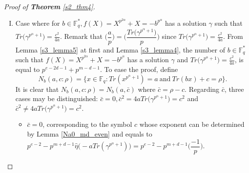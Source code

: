 \documentclass[final,1p,times]{elsarticle}
\begin{document}
\begin{proof}[Proof of \textbf{Theorem} \ref{s2_thm4}]
\begin{enumerate}[(I)]
From Lemma \ref{s3_lemma4}  and Lemma \ref{s3_lemma5}, the number of $ b\in \mathbb{F}_{q}^{*}$ such that $f(X)=X^{p^{2\alpha}} +X=- b^{p^{\alpha}} $ has a solution $ \gamma $ and $ Tr\bigl(\gamma^{p^{\alpha}+1}\bigr)=0 $, is equal to $ p^{e-2d-1}-(p-1)p^{m-d-1}-1 $. By Lemma \ref{Na0_md_even}, the exponent of symbol $ c $ is $ p^{e-2}+p^{m+d-1} $. From Lemma \ref{Nac_md_even}, the exponents of other symbols other than $ c $ are $ p^{e-2} $. Hence, \textit{the contribution of this case} to the complete weight enumerator is
\begin{equation}\label{proof_thm4_cwe02}
C_{2}=\bigl(p^{e-2d-1}-(p-1)p^{m-d-1}-1\bigr)w_{c}^{p^{e-2}+p^{m+d-1}}\prod_{\substack{0\leq i\leq p-1\\i\ne c}}w_{i}^{p^{e-2}}.
\end{equation}
From (\ref{proof_thm4_cwe02}), the corresponding Hamming weight and the multiplicity are respectively
\begin{equation}\label{proof_thm4_hamming02}
\begin{split}
wt(C_{2})&=(p-1)p^{e-2}+p^{m+d-1},\\
A_{C_{2}}&=p^{e-2d-1}-(p-1)p^{m-d-1}-1.
\end{split}
\end{equation}
\item Case where for $ b\in \mathbb{F}_{q}^{*}, f(X)=X^{p^{2\alpha}} +X=- b^{p^{\alpha}} $ has a solution $ \gamma $ such that $ Tr\bigl(\gamma^{p^{\alpha}+1}\bigr)=\frac{c^{2}}{4a} $. Remark that $ \biggl(\dfrac{a}{p}\biggr)=\biggl(\dfrac{Tr\bigl(\gamma^{p^{\alpha}+1}\bigr)}{p}\biggr) $ since $ Tr\bigl(\gamma^{p^{\alpha}+1}\bigr)=\frac{c^{2}}{4a} $. From Lemma \ref{s3_lemma5} at first and Lemma \ref{s3_lemma4}, the number of $ b\in \mathbb{F}_{q}^{*}$ such that $f(X)=X^{p^{2\alpha}} +X=- b^{p^{\alpha}} $ has a solution $ \gamma $ and $ Tr\bigl(\gamma^{p^{\alpha}+1}\bigr)=\frac{c^{2}}{4a}$, is equal to $ p^{e-2d-1}+p^{m-d-1} $.
To ease the proof, define
\begin{equation}\label{proof_thm4_Nacnu}
N_{b}(a,c:\rho)=\biggl\lbrace x\in \mathbb{F}_{q}: Tr(x^{p^{\alpha}+1})=a\ \text{and}\ Tr(bx)+c=\rho\biggr\rbrace.
\end{equation}
It is clear that $ N_{b}(a,c:\rho)= N_{b}(a,\bar{c})$ where $ \bar{c}=\rho-c $. Regarding $ \bar{c} $, three cases may be distinguished: $ \bar{c}=0,\bar{c}^{2}=4aTr\bigl(\gamma^{p^{\alpha}+1}\bigr)=c^{2} $ and $ \bar{c}^{2}\ne 4aTr\bigl(\gamma^{p^{\alpha}+1}\bigr)=c^{2} $.
\begin{itemize}
\item $ \bar{c}=0 $, corresponding to the symbol $ c $ whose exponent can be determined by Lemma \ref{Na0_md_even} and equals to $ p^{e-2}-p^{m+d-1}\widehat{\eta}\bigl(-aTr(\gamma^{p^{\alpha}+1})\bigr)=p^{e-2}-p^{m+d-1}\biggl(\dfrac{-1}{p}\biggr) $.

\end{itemize}
\end{enumerate}
\end{proof}
\end{document}
